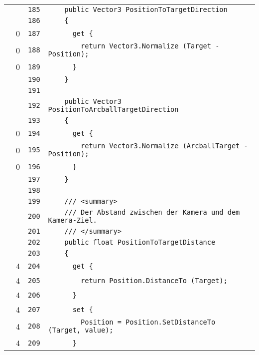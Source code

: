 \documentclass[a4paper,10pt]{article}
\begin{document}
\begin{longtable}[l]{lrrl}
\cellcolor{gray} &  & \verb~185~ & \verb~    public Vector3 PositionToTargetDirection~\\
\cellcolor{gray} &  & \verb~186~ & \verb~    {~\\
\cellcolor{red} & 0 & \verb~187~ & \verb~      get {~\\
\cellcolor{red} & 0 & \verb~188~ & \verb~        return Vector3.Normalize (Target - Position);~\\
\cellcolor{red} & 0 & \verb~189~ & \verb~      }~\\
\cellcolor{gray} &  & \verb~190~ & \verb~    }~\\
\cellcolor{gray} &  & \verb~191~ & \verb~~\\
\cellcolor{gray} &  & \verb~192~ & \verb~    public Vector3 PositionToArcballTargetDirection~\\
\cellcolor{gray} &  & \verb~193~ & \verb~    {~\\
\cellcolor{red} & 0 & \verb~194~ & \verb~      get {~\\
\cellcolor{red} & 0 & \verb~195~ & \verb~        return Vector3.Normalize (ArcballTarget - Position);~\\
\cellcolor{red} & 0 & \verb~196~ & \verb~      }~\\
\cellcolor{gray} &  & \verb~197~ & \verb~    }~\\
\cellcolor{gray} &  & \verb~198~ & \verb~~\\
\cellcolor{gray} &  & \verb~199~ & \verb~    /// <summary>~\\
\cellcolor{gray} &  & \verb~200~ & \verb~    /// Der Abstand zwischen der Kamera und dem Kamera-Ziel.~\\
\cellcolor{gray} &  & \verb~201~ & \verb~    /// </summary>~\\
\cellcolor{gray} &  & \verb~202~ & \verb~    public float PositionToTargetDistance~\\
\cellcolor{gray} &  & \verb~203~ & \verb~    {~\\
\cellcolor{green} & 4 & \verb~204~ & \verb~      get {~\\
\cellcolor{green} & 4 & \verb~205~ & \verb~        return Position.DistanceTo (Target);~\\
\cellcolor{green} & 4 & \verb~206~ & \verb~      }~\\
\cellcolor{green} & 4 & \verb~207~ & \verb~      set {~\\
\cellcolor{green} & 4 & \verb~208~ & \verb~        Position = Position.SetDistanceTo (Target, value);~\\
\cellcolor{green} & 4 & \verb~209~ & \verb~      }~\\

\end{longtable}
\end{document}

